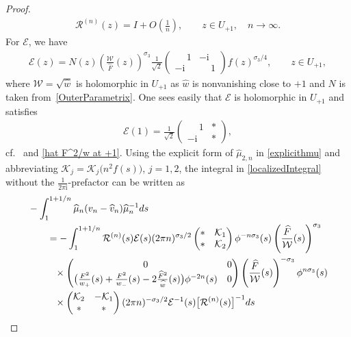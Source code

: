 \documentclass[11pt]{article}
\numberwithin{equation}{section}
\newcommand{\Id}{I}
\newcommand{\cK}{\mathcal{K}}
\newcommand{\cE}{\mathcal{E}}
\newcommand{\cR}{\mathcal{R}}
\newcommand{\cW}{\mathcal{W}}
\newcommand{\hw}{\widehat w}
\newcommand{\hmu}{{\widehat \mu}}
\newcommand{\bv}{v}
\newcommand{\hv}{{\widehat v}}
\newcommand{\hF}{\widehat F}
\newcommand{\hFw}{\frac{\hF^2}{\hw}}
\newcommand{\I}{\mathrm{i}}
\numberwithin{equation}{section}
\begin{document}
\begin{proof}
\begin{align*}
\cR^{(n)}(z) = \Id + O\left(\frac{1}{n} \right), \qquad z \in U_{+1},\quad n \to \infty.
\end{align*}
For $\cE$, we have
\begin{align*}
 \cE(z) = N(z)\left(\frac{ \cW}{\hF}(z)\right)^{\sigma_3}\frac{1}{\sqrt{2}}
 \begin{pmatrix}
 \phantom{-} 1 & -\I
 \\
 -\I & \phantom{-} 1
 \end{pmatrix}f(z)^{\sigma_3/4}, \qquad z \in U_{+1},
\end{align*}
where $\cW = \sqrt{\hw}$ is holomorphic in $U_{+1}$ as $\hw$ is nonvanishing close to $+1$ and $N$ is taken from~\eqref{OuterParametrix}. One sees easily that $\cE$ is holomorphic in $U_{+1}$ and satisfies
\begin{align*}
 \cE(1) = \frac{1}{\sqrt{2}}
 \begin{pmatrix}
 \phantom{-} 1 & *
 \\
 -\I & *
 \end{pmatrix},
\end{align*}
cf.\ \cite[Proposition~C.2]{CD} and \eqref{hat F^2/w at +1}. Using the explicit form of $\hmu_{2,n}$ in \eqref{explicithmu} and abbreviating $\cK_j = \cK_j\big(n^2 f(s)\big)$, $j = 1,2$, the integral in \eqref{localizedIntegral} without the $\frac{1}{2\pi\I}$-prefactor can be written as
\begin{align}
 &-\int_1^{1+1/n} \hmu_n(\bv_n-\hv_n)\hmu_n^{-1} {\rm d}s\nonumber
 \\
 &\qquad= -\int_1^{1+1/n} \cR^{(n)}(s)\cE(s)(2\pi n)^{\sigma_3/2}
 \begin{pmatrix}
 * & \cK_1
 \\
 * & \cK_2
 \end{pmatrix}
 \phi^{-n\sigma_3}(s)\left(\frac{\hF}{\cW}(s)\right)^{\sigma_3}\nonumber
 \\
 &\phantom{\qquad=}{}\times \begin{pmatrix}
 0 & 0
 \\
 \big(\frac{F^2}{w_+}(s)+\frac{F^2}{w_-}(s)-2\hFw(s)\big) \phi^{-2n}(s) & 0
 \end{pmatrix}
 \left(\frac{\hF}{\cW}(s)\right)^{-\sigma_3}\phi^{n\sigma_3}(s)\nonumber
 \\
 &\phantom{\qquad=}{}\times \begin{pmatrix}
 \cK_2 & -\cK_1
 \\
 * & *
 \end{pmatrix}(2\pi n)^{-\sigma_3/2}\cE^{-1}(s) \big[\cR^{(n)}(s)\big]^{-1} {\rm d}s\nonumber

\end{align}
\end{proof}
\end{document}
